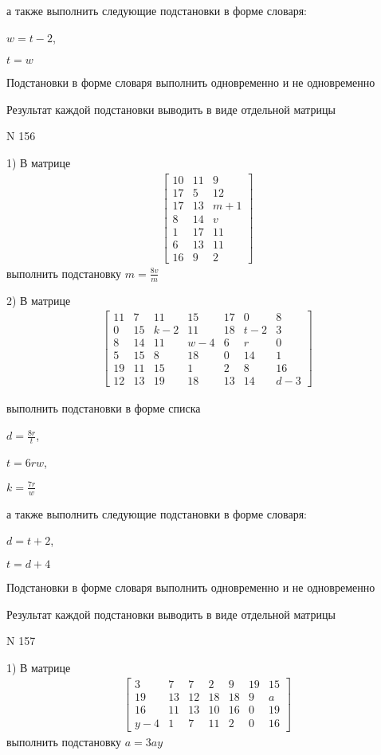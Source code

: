 \documentclass[11pt]{report}
\begin{document}
а также выполнить следующие подстановки в форме словаря:

$w=t - 2$,

$t=w$


    Подстановки в форме словаря выполнить одновременно и не одновременно


    Результат каждой подстановки выводить в виде отдельной матрицы

\newpage
N 156


    1) В матрице
\begin{align*}
\left[\begin{matrix}10 & 11 & 9\\17 & 5 & 12\\17 & 13 & m + 1\\8 & 14 & v\\1 & 17 & 11\\6 & 13 & 11\\16 & 9 & 2\end{matrix}\right]
\end{align*}
выполнить подстановку $m=\frac{8 v}{m}$


    2) В матрице
\begin{align*}
\left[\begin{matrix}11 & 7 & 11 & 15 & 17 & 0 & 8\\0 & 15 & k - 2 & 11 & 18 & t - 2 & 3\\8 & 14 & 11 & w - 4 & 6 & r & 0\\5 & 15 & 8 & 18 & 0 & 14 & 1\\19 & 11 & 15 & 1 & 2 & 8 & 16\\12 & 13 & 19 & 18 & 13 & 14 & d - 3\end{matrix}\right]
\end{align*}

выполнить подстановки в форме списка

$d=\frac{8 r}{t}$,

$t=6 r w$,

$k=\frac{7 r}{w}$

а также выполнить следующие подстановки в форме словаря:

$d=t + 2$,

$t=d + 4$


    Подстановки в форме словаря выполнить одновременно и не одновременно


    Результат каждой подстановки выводить в виде отдельной матрицы

\newpage
N 157


    1) В матрице
\begin{align*}
\left[\begin{matrix}3 & 7 & 7 & 2 & 9 & 19 & 15\\19 & 13 & 12 & 18 & 18 & 9 & a\\16 & 11 & 13 & 10 & 16 & 0 & 19\\y - 4 & 1 & 7 & 11 & 2 & 0 & 16\end{matrix}\right]
\end{align*}
выполнить подстановку $a=3 a y$
\end{document}
